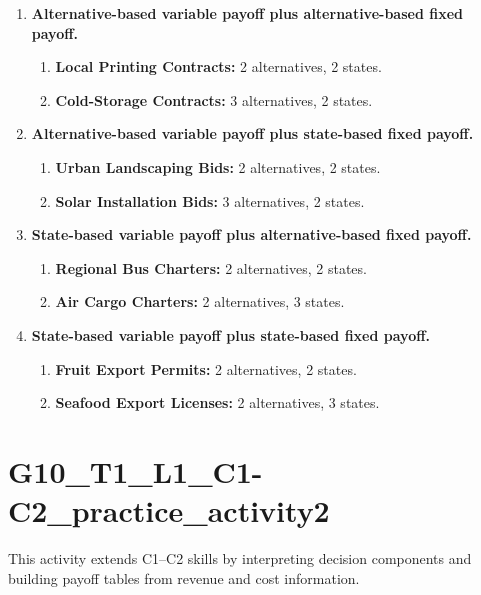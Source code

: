 \begin{enumerate}
		\item \textbf{Alternative-based variable payoff plus alternative-based fixed payoff.}
		\begin{enumerate}
			\item \textbf{Local Printing Contracts:} 2 alternatives, 2 states.
			\item \textbf{Cold-Storage Contracts:} 3 alternatives, 2 states.
		\end{enumerate}
		
		\item \textbf{Alternative-based variable payoff plus state-based fixed payoff.}
		\begin{enumerate}
			\item \textbf{Urban Landscaping Bids:} 2 alternatives, 2 states.
			\item \textbf{Solar Installation Bids:} 3 alternatives, 2 states.
		\end{enumerate}
		
		\item \textbf{State-based variable payoff plus alternative-based fixed payoff.}
		\begin{enumerate}
			\item \textbf{Regional Bus Charters:} 2 alternatives, 2 states.
			\item \textbf{Air Cargo Charters:} 2 alternatives, 3 states.
		\end{enumerate}
		
		\item \textbf{State-based variable payoff plus state-based fixed payoff.}
		\begin{enumerate}
			\item \textbf{Fruit Export Permits:} 2 alternatives, 2 states.
			\item \textbf{Seafood Export Licenses:} 2 alternatives, 3 states.
		\end{enumerate}
	\end{enumerate}
	
	\section{G10\_T1\_L1\_C1-C2\_practice\_activity2}
	This activity extends C1--C2 skills by interpreting decision components and building payoff tables from revenue and cost information.

